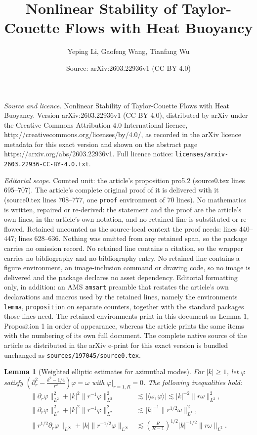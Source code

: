 \documentclass[10pt,a4paper]{amsart}
\title{Nonlinear Stability of Taylor-Couette Flows with Heat Buoyancy}
\author{Yeping Li, Gaofeng Wang, Tianfang Wu}
\date{Source: arXiv:2603.22936v1 (CC BY 4.0)}
\newtheorem{lemma}{Lemma}
\begin{document}
\maketitle

\noindent\emph{Source and licence.} Nonlinear Stability of Taylor-Couette Flows with Heat Buoyancy. Version arXiv:2603.22936v1 (CC BY 4.0), distributed by arXiv under the Creative Commons Attribution 4.0 International licence, http://creativecommons.org/licenses/by/4.0/, as recorded in the arXiv licence metadata for this exact version and shown on the abstract page https://arxiv.org/abs/2603.22936v1. Full licence notice: \texttt{licenses/arxiv-2603.22936-CC-BY-4.0.txt}.\par\smallskip

\noindent\textit{Editorial scope.} Counted unit: the article's proposition pro5.2 (source0.tex lines 695--707). The article's complete original proof of it is delivered with it (source0.tex lines 708--777, one \texttt{proof} environment of 70 lines). No mathematics is written, repaired or re-derived: the statement and the proof are the article's own lines, in the article's own notation, and no retained line is substituted or re-flowed.  Retained uncounted as the source-local context the proof needs: lines 440--447; lines 628--636.  Nothing was omitted from any retained span, so the package carries no omission record.  No retained line contains a citation, so the wrapper carries no bibliography and no bibliography entry.  No retained line contains a figure environment, an image-inclusion command or drawing code, so no image is delivered and the package declares no asset dependency.  Editorial formatting only, in addition: an AMS \texttt{amsart} preamble that restates the article's own declarations and macros used by the retained lines, namely the environments \texttt{lemma}, \texttt{proposition} on separate counters, together with the standard packages those lines need.  The retained environments print in this document as Lemma 1, Proposition 1 in order of appearance, whereas the article prints the same items with the numbering of its own full document.  The complete native source of the article as distributed in the arXiv e-print for this exact version is bundled unchanged as \texttt{sources/197045/source0.tex}.
\begin{lemma}[Weighted elliptic estimates for azimuthal modes] \label{lem2.1}
For $|k| \geq 1$, let $\varphi$ satisfy $\left(\partial_r^2 - \frac{k^2 - 1/4}{r^2}\right) \varphi = \omega$ with $\varphi|_{r=1,R} = 0$. The following inequalities hold:
\begin{align}
\|\partial_r \varphi\|_{L^2}^2 + |k|^2 \|r^{-1}\varphi\|_{L^2}^2 &\lesssim |\langle \omega, \varphi\rangle| \lesssim |k|^{-2} \|r \omega\|_{L^2}^2,\\
\|\partial_r \varphi\|_{L^2}^2 + |k|^2 \|r^{-1}\varphi\|_{L^2}^2 &\lesssim |k|^{-1} \|r^{1/2} \omega\|_{L^1}^2,\\
\|r^{1/2} \partial_r \varphi\|_{L^{\infty}} + |k| \|r^{-1/2} \varphi\|_{L^{\infty}} &\lesssim \left(\frac{R}{R-1}\right)^{1/2} |k|^{-1/2} \|r \omega\|_{L^2}.
\end{align}
\end{lemma}
\end{document}
